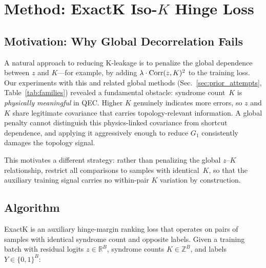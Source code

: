 
\section{Method: ExactK Iso-$K$ Hinge Loss}
\label{sec:method}

\subsection{Motivation: Why Global Decorrelation Fails}
\label{sec:prior_mitigation}

A natural approach to reducing K-leakage is to penalize the global dependence between $z$ and $K$---for example, by adding $\lambda \cdot \mathrm{Corr}(z, K)^2$ to the training loss. Our experiments with this and related global methods (Sec.~\ref{sec:prior_attempts}, Table~\ref{tab:families}) revealed a fundamental obstacle: syndrome count~$K$ is \emph{physically meaningful} in QEC\@. Higher $K$ genuinely indicates more errors, so $z$ and $K$ share legitimate covariance that carries topology-relevant information. A global penalty cannot distinguish this physics-linked covariance from shortcut dependence, and applying it aggressively enough to reduce $G_1$ consistently damages the topology signal.

This motivates a different strategy: rather than penalizing the global $z$--$K$ relationship, restrict all comparisons to samples with identical~$K$, so that the auxiliary training signal carries no within-pair $K$ variation by construction.

\subsection{Algorithm}

ExactK is an auxiliary hinge-margin ranking loss that operates on pairs of samples with identical syndrome count and opposite labels. Given a training batch with residual logits $z \in \mathbb{R}^B$, syndrome counts $K \in \mathbb{Z}^B$, and labels $Y \in \{0,1\}^B$:

